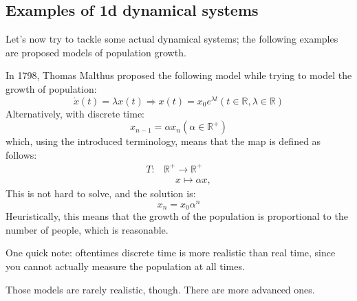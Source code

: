 \subsection{Examples of 1d dynamical systems}
Let's now try to tackle some actual dynamical systems; the following examples are proposed models of population growth.
\begin{example}
    In 1798, Thomas Malthus proposed the following model while trying to model the growth of population:
    \begin{equation*}
        \dot{x}(t)=\lambda x(t)\Rightarrow x(t)=x_0e^{\lambda t} (t\in\mathbb{R}, \lambda\in\mathbb{R})
    \end{equation*}
    Alternatively, with discrete time:
    \begin{equation*}
        x_{n-1}=\alpha x_n (\alpha\in\mathbb{R}^+)
    \end{equation*}
    which, using the introduced terminology, means that the map is defined as follows:
    \begin{align*}
    T\colon&\mathbb{R}^+\longrightarrow\mathbb{R}^+\\
    &\phantom{+}x\mapsto \alpha x,
     \end{align*}
    This is not hard to solve, and the solution is:
    \begin{equation*}
        x_n=x_0\alpha^n
    \end{equation*}
    Heuristically, this means that the growth of the population is proportional to the number of people, which is reasonable. 

    One quick note: oftentimes discrete time is more realistic than real time, since you cannot actually measure the population at all times.
\end{example}
Those models are rarely realistic, though. There are more advanced ones.
